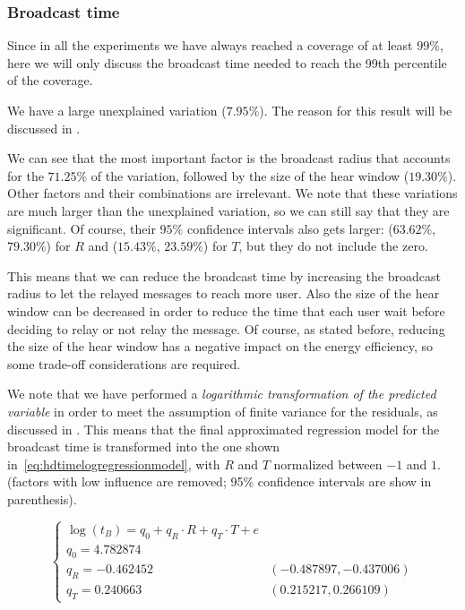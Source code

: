 \subsubsection{Broadcast time}\label{subsubsec:hd2krtime}

Since in all the experiments we have always reached a coverage of at least
\(99\%\), here we will only discuss the broadcast time needed to reach the 99th
percentile of the coverage.

We have a large unexplained variation (\(7.95\%\)). The reason for this result
will be discussed in .

We can see that the most important factor is the broadcast radius that accounts
for the \(71.25\%\) of the variation, followed by the size of the hear window
(\(19.30\%\)). Other factors and their combinations are irrelevant. We note that
these variations are much larger than the unexplained variation, so we can still
say that they are significant. Of course, their \(95\%\) confidence intervals
also gets larger: (\(63.62\%\), \(79.30\%\)) for \(R\) and (\(15.43\%\),
\(23.59\%\)) for \(T\), but they do not include the zero.

This means that we can reduce the broadcast time by increasing the broadcast
radius to let the relayed messages to reach more user. Also the size of the hear
window can be decreased in order to reduce the time that each user wait before
deciding to relay or not relay the message. Of course, as stated before,
reducing the size of the hear window has a negative impact on the energy
efficiency, so some trade-off considerations are required.

We note that we have performed a \emph{logarithmic transformation of the
predicted variable}  in order to meet the
assumption of finite variance for the residuals, as discussed in
. This means that the final approximated regression
model for the broadcast time is transformed into the one shown
in~\eqref{eq:hdtimelogregressionmodel}, with \(R\) and \(T\) normalized between
\(-1\) and \(1\). (factors with low influence are removed; 95\% confidence
intervals are show in parenthesis).

\begin{equation}\label{eq:hdtimelogregressionmodel}
	\begin{cases}
		\log(t_B) = q_0 + q_R \cdot R + q_T \cdot T + e\\
		q_0 = 4.782874\\
		q_R = -0.462452 & (-0.487897, -0.437006)\\
		q_T = 0.240663 & (0.215217, 0.266109)
	\end{cases}
\end{equation}

